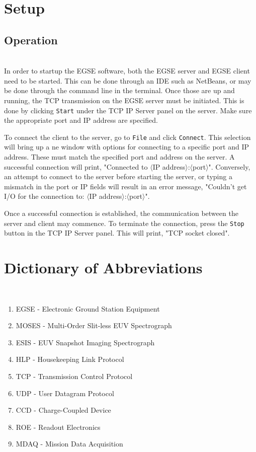 \documentclass[11pt,titlepage]{article}
\begin{document}
\newpage	
\section{Setup}
	\subsection{Operation}
	\hrulefill
	\\
	In order to startup the EGSE software, both the EGSE server and EGSE client need to be started. This can be done through an IDE such as NetBeans, or may be done through the command line in the terminal. Once those are up and running, the TCP transmission on the EGSE server must be initiated. This is done by clicking \texttt{Start} under the TCP IP Server panel on the server. Make sure the appropriate port and IP address are specified. \par
	To connect the client to the server, go to \texttt{File} and click \texttt{Connect}. This selection will bring up a ne window with options for connecting to a specific port and IP address. These must match the specified port and address on the server. A successful connection will print, "Connected to $\langle$IP address$\rangle$:$\langle$port$\rangle$". Conversely, an attempt to connect to the server before starting the server, or typing a mismatch in the port or IP fields will result in an error message, "Couldn't get I/O for the connection to: $\langle$IP address$\rangle$:$\langle$port$\rangle$". \par
	Once a successful connection is established, the communication between the server and client may commence. To terminate the connection, press the \texttt{Stop} button in the TCP IP Server panel. This will print, "TCP socket closed". 
	\\
	
\newpage
\section{Dictionary of Abbreviations}
	\hrulefill
	\\
	\begin{enumerate}
		\item EGSE - Electronic Ground Station Equipment
		\item MOSES - Multi-Order Slit-less EUV Spectrograph
		\item ESIS - EUV Snapshot Imaging Spectrograph
		\item HLP - Housekeeping Link Protocol
		\item TCP - Transmission Control Protocol
		\item UDP - User Datagram Protocol
		\item CCD - Charge-Coupled Device
		\item ROE - Readout Electronics
		\item MDAQ - Mission Data Acquisition
	\end{enumerate}

	
\end{document}
